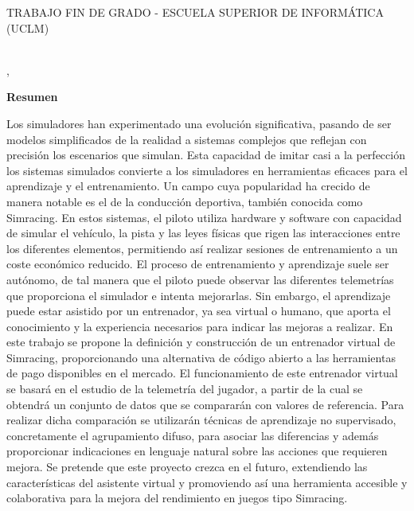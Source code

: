\pagestyle{plain}	%

%
% 
%

\makeatletter
\begin{center} %
   {\textsc{TRABAJO FIN DE GRADO - ESCUELA SUPERIOR DE INFORMÁTICA 
   (UCLM)}\par} %
   \vspace{1cm} %
   {\textbf{\Large\@tituloCorto}\par}  %
   \vspace{0.4cm} %
   {\@autor \\ \@cityTF,{} \@mesTF{} \@yearTF\par} 
   \vspace{0.9cm} %
   {\textbf{\large\textsf{Resumen}}\par} %
\end{center}   
\makeatother %

Los simuladores han experimentado una evolución significativa, pasando de ser modelos simplificados de la realidad a sistemas complejos que reflejan con precisión los escenarios que simulan. Esta capacidad de imitar casi a la perfección los sistemas simulados convierte a los simuladores en herramientas eficaces para el aprendizaje y el entrenamiento. Un campo cuya popularidad  ha crecido de manera notable es el de la conducción deportiva, también conocida como Simracing. En estos sistemas, el piloto utiliza hardware y software con capacidad de simular el vehículo, la pista y las leyes físicas que rigen las interacciones entre los diferentes elementos, permitiendo así realizar sesiones de entrenamiento a un coste económico reducido.
El proceso de entrenamiento y aprendizaje suele ser autónomo, de tal manera que el piloto puede observar las diferentes telemetrías que proporciona el simulador e intenta mejorarlas. Sin embargo, el aprendizaje puede estar asistido por un entrenador, ya sea virtual o humano, que aporta el conocimiento y la experiencia necesarios para indicar las mejoras a realizar.
En este trabajo se propone la definición y construcción de un entrenador virtual de Simracing, proporcionando una alternativa de código abierto a las herramientas de pago disponibles en el mercado. El funcionamiento de este entrenador virtual se basará en el estudio de la telemetría del jugador, a partir de la cual se obtendrá un conjunto de datos que se compararán con valores de referencia. Para realizar dicha comparación se utilizarán técnicas de aprendizaje no supervisado, concretamente el agrupamiento difuso, para asociar las diferencias y además proporcionar indicaciones en lenguaje natural sobre las acciones que requieren mejora.
Se pretende que este proyecto crezca en el futuro, extendiendo las características del asistente virtual y promoviendo así una herramienta accesible y colaborativa para la mejora del rendimiento en juegos tipo Simracing.


